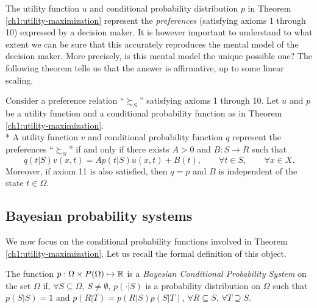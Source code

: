 The utility function $u$ and conditional probability distribution $p$ in Theorem \ref{ch1:utility-maximization} represent the \emph{preferences} (satisfying axioms 1 through 10) expressed by a decision maker. 
It is however important to understand to what extent  we can be sure that this accurately reproduces the mental model of the decision maker. More precisely, is this mental model the unique possible one?  The following theorem tells us that the answer is affirmative, up to some linear scaling.

\begin{theorem}
Consider a preference relation ``$\succsim_S$'' satisfying axioms 1 through 10.
Let $u$ and $p$ be a utility function and a conditional probability function as in Theorem \ref{ch1:utility-maximization}. \\*
A utility function $v$ and conditional probability function $q$ represent the preferences ``$\succsim_S$'' if and only if there  exists $A > 0$ and $B : S \rightarrow R$ such that
$$ q(t|S) v(x,t) = Ap(t|S)u(x,t) + B(t), \qquad \forall t \in S, \qquad \forall x \in X. $$
Moreover, if axiom 11 is also satisfied, then $q = p$ and $B$ is independent of the state $t \in \Omega$.
\label{chap1:thm:Equivalent}
\end{theorem}


\subsection{Bayesian probability systems}

We now focus on the conditional probability functions involved in Theorem \ref{ch1:utility-maximization}. Let us recall the formal definition of this object.

\begin{definition}
The function $p: \Omega \times P(\Omega) \mapsto \mathbb{R} $ is a \emph{Bayesian Conditional Probability System} on the set $\Omega$ if, $\forall S \subseteq \Omega, \, S \neq \emptyset$, $p(\cdot|S)$ is a probability distribution on $\Omega$ such that $p(S|S) = 1$ and $p(R|T) = p(R|S) p(S|T)$, $\forall R \subseteq S$, $\forall T \supseteq S.$
\end{definition}

